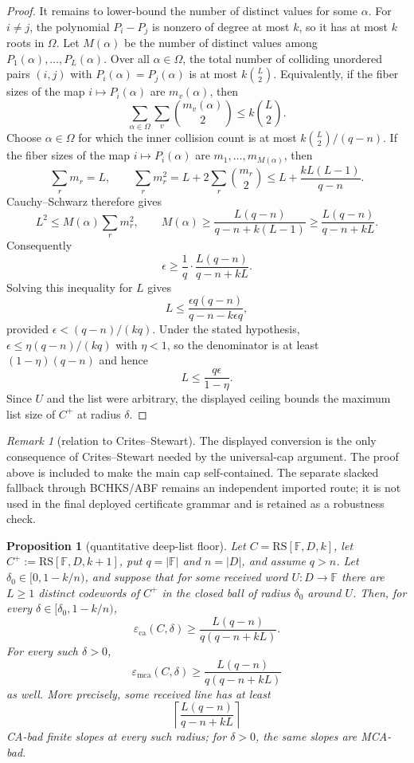 \documentclass[11pt]{article}
\newtheorem{proposition}[theorem]{Proposition}
\theoremstyle{definition}
\theoremstyle{remark}
\newtheorem{remark}[theorem]{Remark}
\newcommand{\F}{\mathbb{F}}
\newcommand{\RS}{\mathrm{RS}}
\newcommand{\eca}{\varepsilon_{\mathrm{ca}}}
\newcommand{\emca}{\varepsilon_{\mathrm{mca}}}
\begin{document}
\begin{proof}
It remains to lower-bound the number of distinct values for some
$\alpha$.  For $i\ne j$, the polynomial $P_i-P_j$ is nonzero of degree
at most $k$, so it has at most $k$ roots in $\Omega$.  Let $M(\alpha)$
be the number of distinct values among $P_1(\alpha),\ldots,P_L(\alpha)$.
Over all $\alpha\in\Omega$, the total number of colliding unordered pairs
$(i,j)$ with $P_i(\alpha)=P_j(\alpha)$ is at most $k\binom L2$.
Equivalently, if the fiber sizes of the map $i\mapsto P_i(\alpha)$ are
$m_v(\alpha)$, then
\[
        \sum_{\alpha\in\Omega}\sum_v \binom{m_v(\alpha)}2
        \le k\binom L2 .
\]
Choose $\alpha\in\Omega$ for which the inner collision count is at most
$k\binom L2/(q-n)$.  If the fiber sizes of the map $i\mapsto P_i(\alpha)$ are
$m_1,\ldots,m_{M(\alpha)}$, then
\[
        \sum_r m_r=L,
        \qquad
        \sum_r m_r^2=L+2\sum_r\binom{m_r}{2}
        \le L+\frac{kL(L-1)}{q-n}.
\]
Cauchy--Schwarz therefore gives
\[
        L^2\le M(\alpha)\sum_r m_r^2,
        \qquad
        M(\alpha)\ge
        \frac{L(q-n)}{q-n+k(L-1)}
        \ge
        \frac{L(q-n)}{q-n+kL} .
\]
Consequently
\[
        \epsilon
        \ge
        \frac1q\cdot \frac{L(q-n)}{q-n+kL}.
\]
Solving this inequality for $L$ gives
\[
        L
        \le
        \frac{\epsilon q(q-n)}{q-n-k\epsilon q},
\]
provided $\epsilon<(q-n)/(kq)$.  Under the stated hypothesis,
$\epsilon\le\eta(q-n)/(kq)$ with $\eta<1$, so the denominator is at
least $(1-\eta)(q-n)$ and hence
\[
        L\le \frac{q\epsilon}{1-\eta}.
\]
Since $U$ and the list were arbitrary, the displayed ceiling bounds the
maximum list size of $C^+$ at radius $\delta$.
\end{proof}

\begin{remark}[relation to Crites--Stewart]
The displayed conversion is the only consequence of Crites--Stewart
needed by the universal-cap argument.  The proof above is included to make the main cap
self-contained.  The separate slacked fallback through BCHKS/ABF remains
an independent imported route; it is not used in the final deployed certificate
grammar and is retained as a robustness check.
\end{remark}

\begin{proposition}[quantitative deep-list floor]
\label{prop:quantitative-deep-list-floor}
Let $C=\RS[\F,D,k]$, let $C^+:=\RS[\F,D,k+1]$, put
$q=|\F|$ and $n=|D|$, and assume $q>n$.  Let
$\delta_0\in[0,1-k/n)$, and suppose that for some received word
$U:D\to\F$ there are $L\ge1$ distinct codewords of $C^+$ in the
closed ball of radius $\delta_0$ around $U$.  Then, for every
$\delta\in[\delta_0,1-k/n)$,
\[
        \eca(C,\delta)
        \ge
        \frac{L(q-n)}{q(q-n+kL)} .
\]
For every such $\delta>0$,
\[
        \emca(C,\delta)
        \ge
        \frac{L(q-n)}{q(q-n+kL)}
\]
as well.  More precisely, some received line has at least
\[
        \left\lceil\frac{L(q-n)}{q-n+kL}\right\rceil
\]
CA-bad finite slopes at every such radius; for $\delta>0$, the same slopes are
MCA-bad.
\end{proposition}
\end{document}
